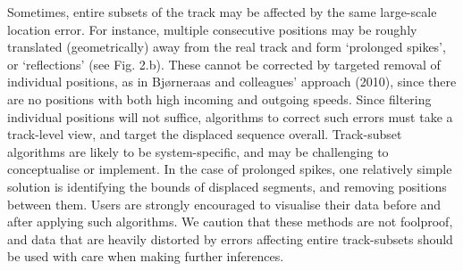 \documentclass[10pt,paper=a4,headings=standardclasses
]{scrartcl}
\begin{document}
Sometimes, entire subsets of the track may be affected by the same large-scale location error.
For instance, multiple consecutive positions may be roughly translated (geometrically) away from the real track and form `prolonged spikes', or `reflections' (see Fig. 2.b).
These cannot be corrected by targeted removal of individual positions, as in Bjørneraas and colleagues' approach (2010), since there are no positions with both high incoming and outgoing speeds.
Since filtering individual positions will not suffice, algorithms to correct such errors must take a track-level view, and target the displaced sequence overall.
Track-subset algorithms are likely to be system-specific, and may be challenging to conceptualise or implement.
In the case of prolonged spikes, one relatively simple solution is identifying the bounds of displaced segments, and removing positions between them.
Users are strongly encouraged to visualise their data before and after applying such algorithms. 
We caution that these methods are not foolproof, and data that are heavily distorted by errors affecting entire track-subsets should be used with care when making further inferences.

\end{document}
